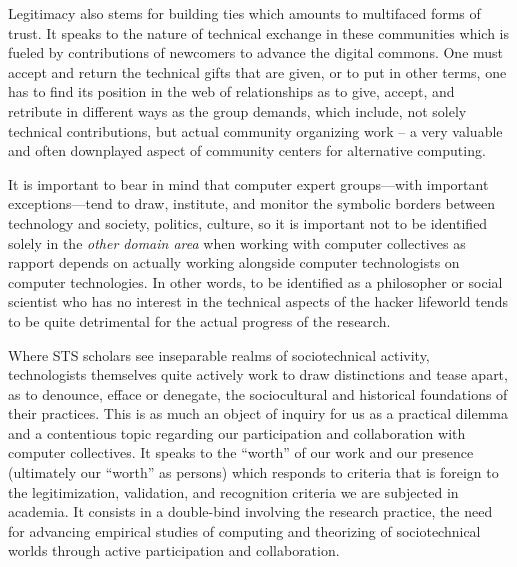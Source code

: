 \documentclass[10pt,letter,oneside]{scrartcl}
\begin{document}


Legitimacy also stems for building ties which amounts to multifaced
forms of trust. It speaks to the nature of technical exchange in these
communities which is fueled by contributions of newcomers to advance
the digital commons. One must accept and return the technical gifts
that are given, or to put in other terms, one has to find its position
in the web of relationships as to give, accept, and retribute in
different ways as the group demands, which include, not solely
technical contributions, but actual community organizing work -- a
very valuable and often downplayed aspect of community centers for
alternative computing.

It is important to bear in mind that computer expert groups---with 
important exceptions---tend to draw, institute, and monitor the symbolic
borders between technology and society, politics, culture, so it is
important not to be identified solely in the \emph{other domain area} when
working with computer collectives as rapport depends on actually
working alongside computer technologists on computer technologies. 
In other words, to be identified as a philosopher or social scientist
who has no interest in the technical aspects of the hacker lifeworld
tends to be quite detrimental for the actual progress of the research.

Where STS scholars see inseparable realms of sociotechnical
activity, technologists themselves quite actively work to draw
distinctions and tease apart, as to denounce, efface or denegate,
the sociocultural and historical foundations of their practices. 
This is as much an object of inquiry for us as a practical dilemma 
and a contentious topic regarding our participation and collaboration 
with computer collectives. It speaks to the ``worth'' of our work 
and our presence (ultimately our ``worth'' as persons) which 
responds to criteria that is foreign to the legitimization, 
validation, and recognition criteria we are subjected in academia. 
It consists in a double-bind involving the research practice, the 
need for advancing empirical studies of computing and theorizing 
of sociotechnical worlds through active participation and collaboration.
\end{document}
